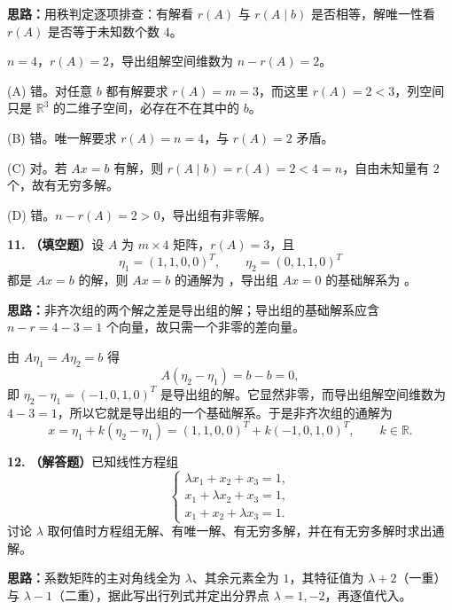 \ifshowsolutions%

\textbf{思路：}用秩判定逐项排查：有解看 $r(A)$ 与 $r(A\mid b)$ 是否相等，解唯一性看 $r(A)$ 是否等于未知数个数 $4$。

$n=4$，$r(A)=2$，导出组解空间维数为 $n-r(A)=2$。

(A) 错。对任意 $b$ 都有解要求 $r(A)=m=3$，而这里 $r(A)=2<3$，列空间只是 $\mathbb R^3$ 的二维子空间，必存在不在其中的 $b$。

(B) 错。唯一解要求 $r(A)=n=4$，与 $r(A)=2$ 矛盾。

(C) 对。若 $Ax=b$ 有解，则 $r(A\mid b)=r(A)=2<4=n$，自由未知量有 $2$ 个，故有无穷多解。

(D) 错。$n-r(A)=2>0$，导出组有非零解。

\else \answerarea[4] \fi%

\textbf{11.} \textbf{（填空题）}设 $A$ 为 $m\times 4$ 矩阵，$r(A)=3$，且
\[
\eta_1=(1,1,0,0)^T,\qquad \eta_2=(0,1,1,0)^T
\]
都是 $Ax=b$ 的解，则 $Ax=b$ 的通解为 \underline{\hspace{5cm}}，导出组 $Ax=0$ 的基础解系为 \underline{\hspace{4cm}}。

\ifshowsolutions%

\textbf{思路：}非齐次组的两个解之差是导出组的解；导出组的基础解系应含 $n-r=4-3=1$ 个向量，故只需一个非零的差向量。

由 $A\eta_1=A\eta_2=b$ 得
\[
A(\eta_2-\eta_1)=b-b=0,
\]
即 $\eta_2-\eta_1=(-1,0,1,0)^T$ 是导出组的解。它显然非零，而导出组解空间维数为 $4-3=1$，所以它就是导出组的一个基础解系。于是非齐次组的通解为
\[
x=\eta_1+k(\eta_2-\eta_1)=(1,1,0,0)^T+k(-1,0,1,0)^T,\qquad k\in\mathbb R.
\]

\else \answerarea[3] \fi%

\textbf{12.} \textbf{（解答题）}已知线性方程组
\[
\begin{cases}
\lambda x_1+x_2+x_3=1,\\
x_1+\lambda x_2+x_3=1,\\
x_1+x_2+\lambda x_3=1.
\end{cases}
\]
讨论 $\lambda$ 取何值时方程组无解、有唯一解、有无穷多解，并在有无穷多解时求出通解。

\ifshowsolutions%

\textbf{思路：}系数矩阵的主对角线全为 $\lambda$、其余元素全为 $1$，其特征值为 $\lambda+2$（一重）与 $\lambda-1$（二重），据此写出行列式并定出分界点 $\lambda=1,-2$，再逐值代入。


